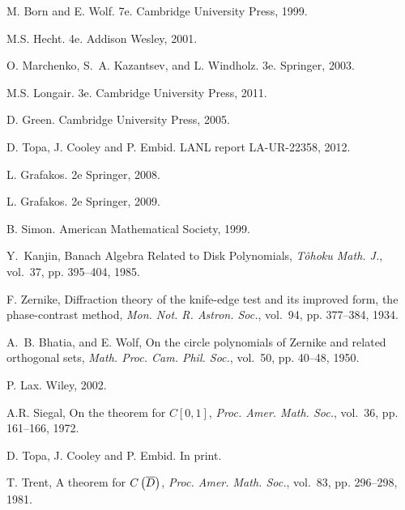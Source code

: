 \documentclass[preprint,12pt]{elsarticle}
\begin{document}
\begin{thebibliography}{00}


 M. Born and E. Wolf.
 7e.
\newblock  Cambridge University Press, 1999.
  
 M.S. Hecht.
 4e.
\newblock  Addison Wesley, 2001.

 O. Marchenko, S.~A. Kazantsev, and L. Windholz.
 3e.
\newblock  Springer, 2003.

 M.S. Longair.
 3e.
\newblock  Cambridge University Press, 2011.

 D. Green.
\newblock  Cambridge University Press, 2005.

 D. Topa, J. Cooley and P. Embid.
\newblock  LANL report LA-UR-22358, 2012.

 L. Grafakos.
 2e
\newblock  Springer, 2008.

 L. Grafakos.
 2e
\newblock  Springer, 2009.

 B. Simon.
\newblock  American Mathematical Society, 1999.

Y.~Kanjin, Banach Algebra Related to Disk Polynomials, 
\emph{T\^ohoku Math. J.}, vol.~37, pp. 395--404, 1985.

F. Zernike, Diffraction theory of the knife-edge test and its improved form, the phase-contrast method, 
\emph{Mon. Not. R. Astron. Soc.}, vol.~94, pp. 377--384, 1934.

A.~B. Bhatia, and E. Wolf, On the circle polynomials of Zernike and related orthogonal sets, 
\emph{Math. Proc. Cam. Phil. Soc.}, vol.~50, pp. 40--48, 1950.

 P. Lax.
\newblock  Wiley, 2002.

A.R. Siegal, On the \mst theorem for $C[0,1]$, 
\emph{Proc. Amer. Math. Soc.}, vol.~36, pp. 161--166, 1972.

 D. Topa, J. Cooley and P. Embid.
\newblock  In print.

T. Trent, A \mst theorem for $C\left( \overline{D} \right)$, 
\emph{Proc. Amer. Math. Soc.}, vol.~83, pp. 296--298, 1981.

\end{thebibliography}
\end{document}
